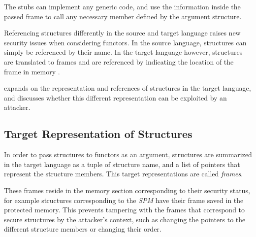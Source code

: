 The stubs can implement any generic code, and use the information inside the passed frame to call any necessary member defined by the argument structure.

\smallskip

Referencing structures differently in the source and target language raises new security issues when considering functors.
In the source language, structures can simply be referenced by their name.
In the target language however, structures are translated to frames and are referenced by indicating the location of the frame in memory .


 expands on the representation and references of structures in the target language, and discusses whether this different representation can be exploited by an attacker.

\subsection{Target Representation of Structures}
\label{sec:LowLevelRepresentation}
In order to pass structures to functors as an argument, structures are summarized in the target language as a tuple of structure name, and a list of pointers that represent the structure members.
This target representations are called \emph{frames}.

These frames reside in the memory section corresponding to their security status, for example
structures corresponding to the \emph{SPM} have their frame saved in the protected memory.
This prevents tampering with the frames that correspond to secure structures by the attacker's context, such as changing the pointers to the different structure members or changing their order.

